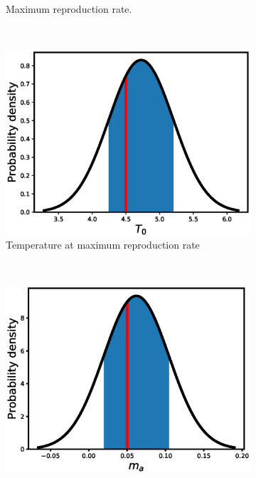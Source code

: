 \documentclass[12pt, table]{article}
\begin{document}
\begin{figure}[H]
\begin{subfigure}[b]{0.45\textwidth}
       \caption{Maximum reproduction  rate.}
       \label{fig2c}
   \end{subfigure}
   ~ %
   \begin{subfigure}[b]{0.45\textwidth}
       \includegraphics[width=1\textwidth, height=0.23\textheight]{figexple3/fT0}
        \caption{Temperature at maximum reproduction rate}
       \label{fig2d}
   \end{subfigure}\\
   \begin{subfigure}[b]{0.45\textwidth}
       \includegraphics[width=1\textwidth, height=0.24\textheight]{figexple3/fmj}

\end{subfigure}
\end{figure}
\end{document}
